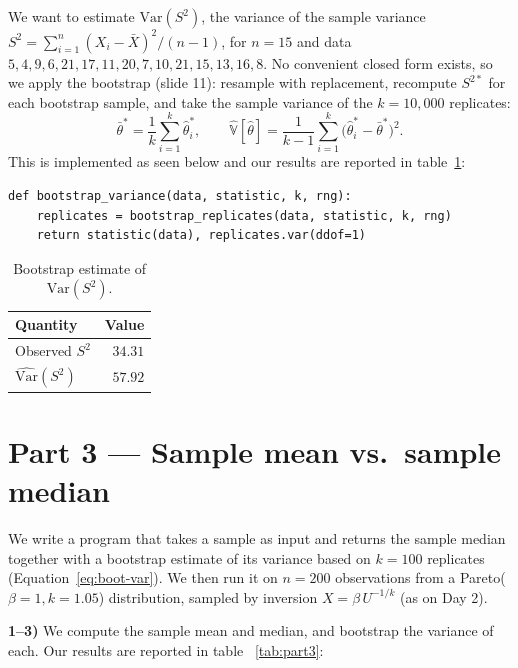 We want to estimate $\mathrm{Var}(S^2)$, the variance of the sample variance
$S^2 = \sum_{i=1}^{n}(X_i - \bar X)^2/(n-1)$, for $n=15$ and data
$5,4,9,6,21,17,11,20,7,10,21,15,13,16,8$. No convenient closed form exists, so
we apply the bootstrap (slide 11): resample with replacement, recompute
$S^{2*}$ for each bootstrap sample, and take the sample variance of the
$k=10{,}000$ replicates:
\begin{equation}
    \bar\theta^* = \frac{1}{k}\sum_{i=1}^{k}\hat\theta^*_i,
    \qquad
    \hat{\mathbb{V}}[\hat\theta] =
        \frac{1}{k-1}\sum_{i=1}^{k}
        \bigl(\hat\theta^*_i - \bar\theta^*\bigr)^2.
    \label{eq:boot-var}
\end{equation}
This is implemented as seen below and our results are reported in table~\ref{tab:part2}:
\begin{verbatim}
def bootstrap_variance(data, statistic, k, rng):
    replicates = bootstrap_replicates(data, statistic, k, rng)
    return statistic(data), replicates.var(ddof=1)
\end{verbatim}

\begin{table}[H]
    \centering
    \caption{Bootstrap estimate of $\mathrm{Var}(S^2)$.}
    \label{tab:part2}
    \renewcommand{\arraystretch}{1.1}
    \begin{tabular}{lr}
        \toprule
        Quantity & Value \\
        \midrule
        Observed $S^2$ & $34.31$ \\
        $\widehat{\mathrm{Var}}(S^2)$ & $57.92$ \\
        \bottomrule
    \end{tabular}
\end{table}


\section*{Part 3 --- Sample mean vs.\ sample median}

We write a program that takes a sample as input and returns the sample median
together with a bootstrap estimate of its variance based on $k=100$ replicates
(Equation~\eqref{eq:boot-var}). We then run it on $n=200$ observations from a
Pareto($\beta=1, k=1.05$) distribution, sampled by inversion
$X = \beta\, U^{-1/k}$ (as on Day 2).

\textbf{1--3)} We compute the sample mean and median, and bootstrap the
variance of each. Our results are reported in table ~\ref{tab:part3}:

